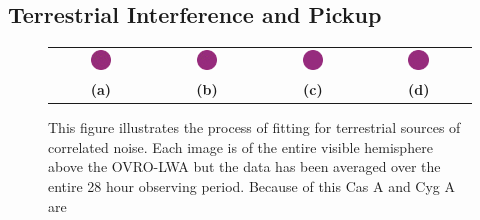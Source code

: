 \documentclass[twocolumn]{aastex6}
\begin{document}
\subsection{Terrestrial Interference and Pickup}

\begin{figure}[ht]
    \centering
    \begin{tabular}{cccc}
        \includegraphics[width=0.22\textwidth]{figures/smeared-images/before-component-removal-spw14} &
        \includegraphics[width=0.22\textwidth]{figures/smeared-images/after-component-removal-spw14} &
        \includegraphics[width=0.22\textwidth]{figures/smeared-images/rfi-like-component-spw14} &
        \includegraphics[width=0.22\textwidth]{figures/smeared-images/pickup-like-component-spw14} \\
        \textbf{(a)} & \textbf{(b)} & \textbf{(c)} & \textbf{(d)} \\
    \end{tabular}
    \caption{
        This figure illustrates the process of fitting for terrestrial sources of correlated noise.
        Each image is of the entire visible hemisphere above the OVRO-LWA but the data has been
        averaged over the entire 28 hour observing period. Because of this Cas A and Cyg A are
}
\end{figure}
\end{document}
